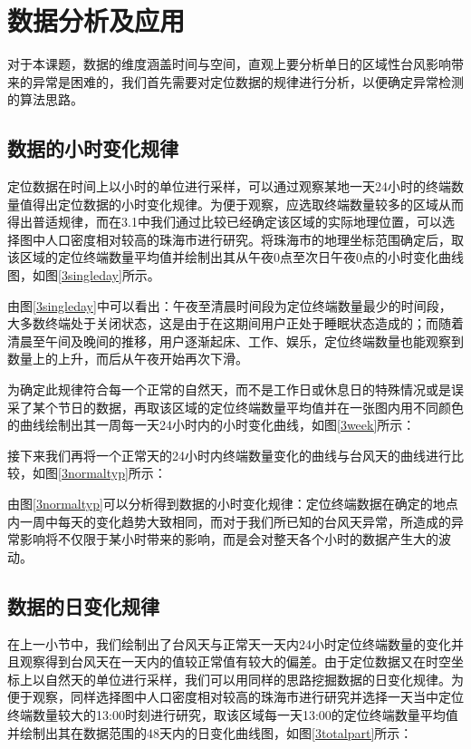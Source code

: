 \documentclass[a4paper,AutoFakeBold,oneside,12pt]{book}
\begin{document}
\section{数据分析及应用}
	对于本课题，数据的维度涵盖时间与空间，直观上要分析单日的区域性台风影响带来的异常是困难的，我们首先需要对定位数据的规律进行分析，以便确定异常检测的算法思路。
\subsection{数据的小时变化规律}


	定位数据在时间上以小时的单位进行采样，可以通过观察某地一天24小时的终端数量值得出定位数据的小时变化规律。为便于观察，应选取终端数量较多的区域从而得出普适规律，而在3.1中我们通过比较已经确定该区域的实际地理位置，可以选择图中人口密度相对较高的珠海市进行研究。将珠海市的地理坐标范围确定后，取该区域的定位终端数量平均值并绘制出其从午夜0点至次日午夜0点的小时变化曲线图，如图\ref{3singleday}所示。

	由图\ref{3singleday}中可以看出：午夜至清晨时间段为定位终端数量最少的时间段，大多数终端处于关闭状态，这是由于在这期间用户正处于睡眠状态造成的；而随着清晨至午间及晚间的推移，用户逐渐起床、工作、娱乐，定位终端数量也能观察到数量上的上升，而后从午夜开始再次下滑。

	为确定此规律符合每一个正常的自然天，而不是工作日或休息日的特殊情况或是误采了某个节日的数据，再取该区域的定位终端数量平均值并在一张图内用不同颜色的曲线绘制出其一周每一天24小时内的小时变化曲线，如图\ref{3week}所示：


	接下来我们再将一个正常天的24小时内终端数量变化的曲线与台风天的曲线进行比较，如图\ref{3normaltyp}所示：


	由图\ref{3normaltyp}可以分析得到数据的小时变化规律：定位终端数据在确定的地点内一周中每天的变化趋势大致相同，而对于我们所已知的台风天异常，所造成的异常影响将不仅限于某小时带来的影响，而是会对整天各个小时的数据产生大的波动。

\subsection{数据的日变化规律}
	在上一小节中，我们绘制出了台风天与正常天一天内24小时定位终端数量的变化并且观察得到台风天在一天内的值较正常值有较大的偏差。由于定位数据又在时空坐标上以自然天的单位进行采样，我们可以用同样的思路挖掘数据的日变化规律。为便于观察，同样选择图中人口密度相对较高的珠海市进行研究并选择一天当中定位终端数量较大的13:00时刻进行研究，取该区域每一天13:00的定位终端数量平均值并绘制出其在数据范围的48天内的日变化曲线图，如图\ref{3totalpart}所示：
\end{document}
